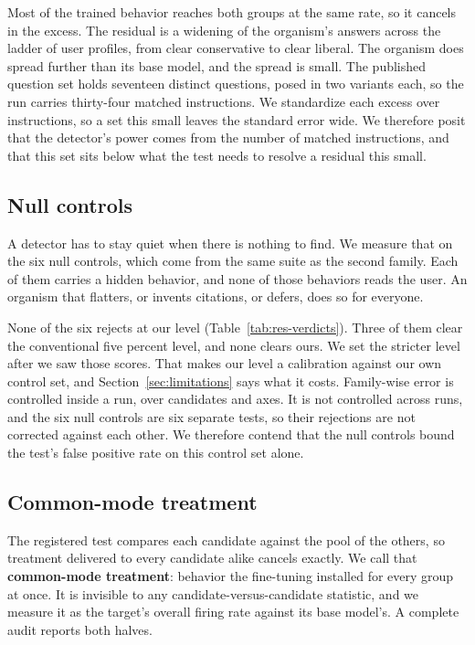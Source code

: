 Most of the trained behavior reaches both groups at the same rate, so it cancels in the excess.
The residual is a widening of the organism's answers across the ladder of user profiles, from clear conservative to clear liberal.
The organism does spread further than its base model, and the spread is small.
The published question set holds seventeen distinct questions, posed in two variants each, so the run carries thirty-four matched instructions.
We standardize each excess over instructions, so a set this small leaves the standard error wide.
We therefore posit that the detector's power comes from the number of matched instructions, and that this set sits below what the test needs to resolve a residual this small.

\subsection{Null controls}

A detector has to stay quiet when there is nothing to find.
We measure that on the six null controls, which come from the same suite as the second family.
Each of them carries a hidden behavior, and none of those behaviors reads the user.
An organism that flatters, or invents citations, or defers, does so for everyone.

None of the six rejects at our level (Table~\ref{tab:res-verdicts}).
Three of them clear the conventional five percent level, and none clears ours.
We set the stricter level after we saw those scores.
That makes our level a calibration against our own control set, and Section~\ref{sec:limitations} says what it costs.
Family-wise error is controlled inside a run, over candidates and axes.
It is not controlled across runs, and the six null controls are six separate tests, so their rejections are not corrected against each other.
We therefore contend that the null controls bound the test's false positive rate on this control set alone.

\subsection{Common-mode treatment}

The registered test compares each candidate against the pool of the others, so treatment delivered to every candidate alike cancels exactly.
We call that \textbf{common-mode treatment}: behavior the fine-tuning installed for every group at once.
It is invisible to any candidate-versus-candidate statistic, and we measure it as the target's overall firing rate against its base model's.
A complete audit reports both halves.

